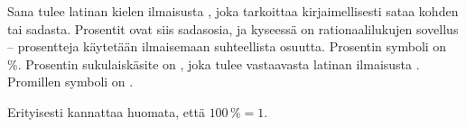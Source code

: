 Sana  tulee latinan kielen ilmaisusta , joka tarkoittaa kirjaimellisesti sataa kohden tai sadasta. Prosentit ovat siis sadasosia, ja kyseessä on rationaalilukujen sovellus -- prosentteja käytetään ilmaisemaan suhteellista osuutta. Prosentin symboli on \%. Prosentin sukulaiskäsite on , joka tulee vastaavasta latinan ilmaisusta . Promillen symboli on \permil.


\begin{esimerkki}
\end{esimerkki}

Erityisesti kannattaa huomata, että $100\,\%=1$.

%

